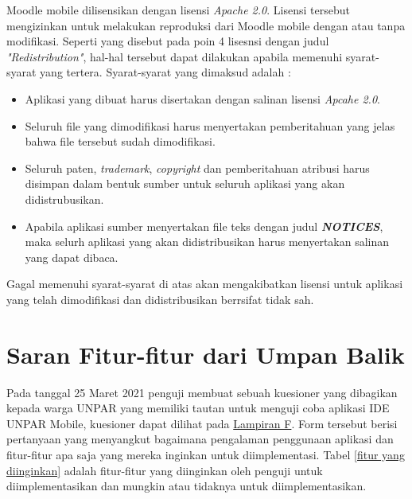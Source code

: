Moodle mobile dilisensikan dengan lisensi \textit{Apache 2.0}\cite{Moodlemobile:license}. Lisensi tersebut mengizinkan untuk melakukan reproduksi dari Moodle mobile dengan atau tanpa modifikasi. Seperti yang disebut pada poin 4 lisesnsi dengan judul \textit{"Redistribution"}, hal-hal tersebut dapat dilakukan apabila memenuhi syarat-syarat yang tertera. Syarat-syarat yang dimaksud adalah :
\begin{itemize}
\item Aplikasi yang dibuat harus disertakan dengan salinan lisensi \textit{Apcahe 2.0}.
\item Seluruh file yang dimodifikasi harus menyertakan pemberitahuan yang jelas bahwa file tersebut sudah dimodifikasi.
\item Seluruh paten, \textit{trademark}, \textit{copyright} dan pemberitahuan atribusi harus disimpan dalam bentuk sumber untuk seluruh aplikasi yang akan didistrubusikan.
\item Apabila aplikasi sumber menyertakan file teks dengan judul \textit{\textbf{NOTICES}}, maka selurh aplikasi yang akan didistribusikan harus menyertakan salinan yang dapat dibaca.
\end{itemize}
Gagal memenuhi syarat-syarat di atas akan mengakibatkan lisensi untuk aplikasi yang telah dimodifikasi dan didistribusikan berrsifat tidak sah.

\section{Saran Fitur-fitur dari Umpan Balik}
\label{feature feedback}

Pada tanggal 25 Maret 2021 penguji membuat sebuah kuesioner yang dibagikan kepada warga UNPAR yang memiliki tautan untuk menguji coba aplikasi IDE UNPAR Mobile, kuesioner dapat dilihat pada \hyperref[lamp:F]{Lampiran F}. Form tersebut berisi pertanyaan yang menyangkut bagaimana pengalaman penggunaan aplikasi dan fitur-fitur apa saja yang mereka inginkan untuk diimplementasi. Tabel \ref{fitur yang diinginkan} adalah fitur-fitur yang diinginkan oleh penguji untuk diimplementasikan dan mungkin atau tidaknya untuk diimplementasikan.

